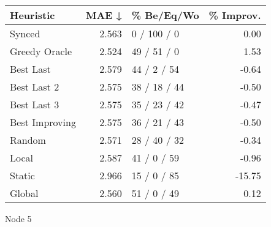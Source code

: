 \begin{tabular}{lrlr}
\toprule
\textbf{Heuristic} & \textbf{MAE ↓} & \textbf{\% Be/Eq/Wo} & \textbf{\% Improv.} \\
\midrule
            Synced &          2.563 &          0 / 100 / 0 &                0.00 \\
     Greedy Oracle &          2.524 &          49 / 51 / 0 &                1.53 \\
         Best Last &          2.579 &          44 / 2 / 54 &               -0.64 \\
       Best Last 2 &          2.575 &         38 / 18 / 44 &               -0.50 \\
       Best Last 3 &          2.575 &         35 / 23 / 42 &               -0.47 \\
    Best Improving &          2.575 &         36 / 21 / 43 &               -0.50 \\
            Random &          2.571 &         28 / 40 / 32 &               -0.34 \\
             Local &          2.587 &          41 / 0 / 59 &               -0.96 \\
            Static &          2.966 &          15 / 0 / 85 &              -15.75 \\
            Global &          2.560 &          51 / 0 / 49 &                0.12 \\
\bottomrule
\end{tabular}
\caption{Node 5}
\label{tab:hr_iid_lr01_le2_bs4_5}
